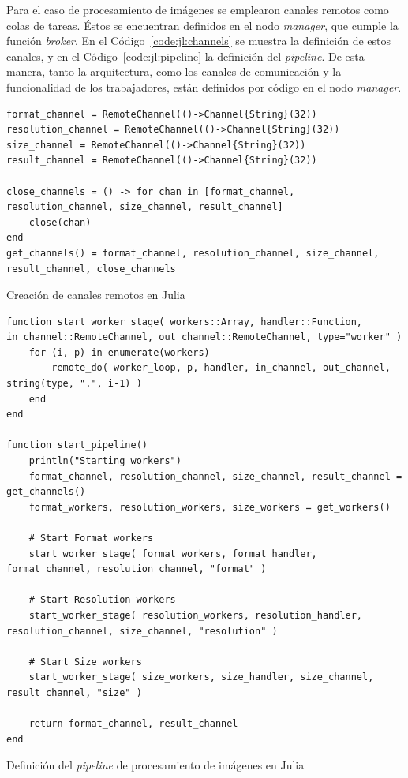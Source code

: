 \documentclass[11pt]{article}
\newcommand{\english}[1]{\textit{#1}}
\begin{document}
Para el caso de procesamiento de imágenes se emplearon canales remotos como colas de tareas. Éstos se encuentran definidos en el nodo \english{manager}, que cumple la función \english{broker}. En el Código~\ref{code:jl:channels} se muestra la definición de estos canales, y en el Código~\ref{code:jl:pipeline} la definición del \english{pipeline}. 
De esta manera, tanto la arquitectura, como los canales de comunicación y la funcionalidad de los trabajadores, están definidos por código en el nodo \english{manager}.

\begin{listing}[ht]
\begin{verbatim}
format_channel = RemoteChannel(()->Channel{String}(32))
resolution_channel = RemoteChannel(()->Channel{String}(32))
size_channel = RemoteChannel(()->Channel{String}(32))
result_channel = RemoteChannel(()->Channel{String}(32))

close_channels = () -> for chan in [format_channel, resolution_channel, size_channel, result_channel]
    close(chan)
end
get_channels() = format_channel, resolution_channel, size_channel, result_channel, close_channels
\end{verbatim}
\caption{Creación de canales remotos en Julia}
\label{code:jl:channels}
\end{listing}

\begin{listing}[ht]
\begin{verbatim}
function start_worker_stage( workers::Array, handler::Function, in_channel::RemoteChannel, out_channel::RemoteChannel, type="worker" )
    for (i, p) in enumerate(workers)
        remote_do( worker_loop, p, handler, in_channel, out_channel, string(type, ".", i-1) )
    end
end

function start_pipeline()
    println("Starting workers")
    format_channel, resolution_channel, size_channel, result_channel = get_channels()
    format_workers, resolution_workers, size_workers = get_workers()

    # Start Format workers
    start_worker_stage( format_workers, format_handler, format_channel, resolution_channel, "format" )
    
    # Start Resolution workers
    start_worker_stage( resolution_workers, resolution_handler, resolution_channel, size_channel, "resolution" )
    
    # Start Size workers
    start_worker_stage( size_workers, size_handler, size_channel, result_channel, "size" )

    return format_channel, result_channel
end
\end{verbatim}
\caption{Definición del \english{pipeline} de procesamiento de imágenes en Julia}
\label{code:jl:pipeline}
\end{listing}
\end{document}
